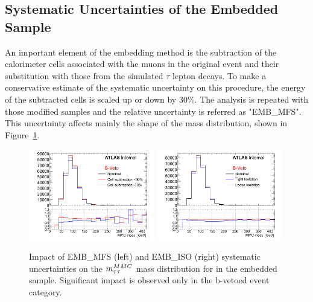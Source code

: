 
\subsection{Systematic Uncertainties of the \Ztautau Embedded Sample}\label{sec:embsys}

An important element of the embedding method is the subtraction of the 
calorimeter cells associated with the muons in the original \Zmumu event and their substitution with those from the simulated $\tau$ lepton
decays. To make a conservative estimate of the systematic uncertainty on this procedure, 
the energy of the subtracted cells is scaled up or down by 30\%. The analysis is repeated with those modified 
samples and the relative uncertainty is referred as "EMB\_MFS". This uncertainty affects mainly the shape of the \mmc mass 
distribution, shown in Figure~\ref{fig:EMBMFS}.

\begin{figure}[tp]
	\begin{center}
	\includegraphics[width=0.49\textwidth]{figure/systematics/emb_sys_NoBtagFull_MFS.png}
	\includegraphics[width=0.49\textwidth]{figure/systematics/emb_sys_NoBtagFull_Iso.png}
	\end{center}
	\caption{Impact of EMB\_MFS (left) and EMB\_ISO (right) systematic uncertainties on the $m_{\tau\tau}^{MMC}$ mass distribution for in the  embedded sample.
	Significant impact is observed only in the b-vetoed event category.}
	\label{fig:EMBMFS}
\end{figure}

